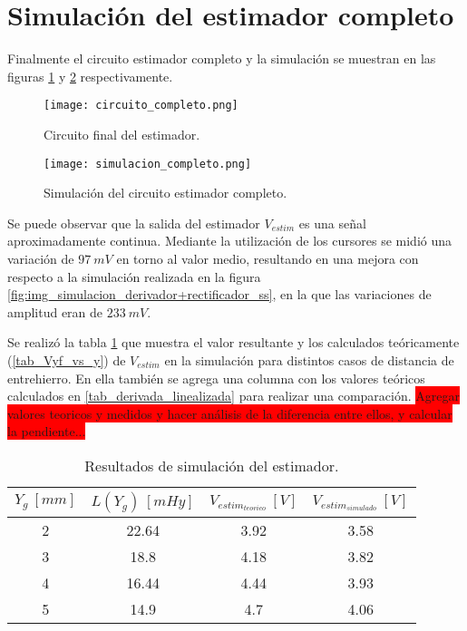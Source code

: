 \section{Simulación del estimador completo}

Finalmente el circuito estimador completo y la simulación se muestran en las figuras \ref{fig:img_circuito_final_del_estimador} y \ref{fig:img_simulacion_completo} respectivamente.

\begin{figure}[H]
\centering
\texttt{[image: circuito\_completo.png]}
\caption{Circuito final del estimador.}
\label{fig:img_circuito_final_del_estimador}
\end{figure}

\begin{figure}[H]
	\centering
	\texttt{[image: simulacion\_completo.png]}
	\caption{Simulación del circuito estimador completo.}
	\label{fig:img_simulacion_completo}
\end{figure}

Se puede observar que la salida del estimador $V_{estim}$ es una señal aproximadamente continua. Mediante la utilización de los cursores se midió una variación de $97\:mV$ en torno al valor medio, resultando en una mejora con respecto a la simulación realizada en la figura \ref{fig:img_simulacion_derivador+rectificador_ss}, en la que las variaciones de amplitud eran de $233\:mV$.

Se realizó la tabla \ref{tab_Resultados_de_simulación_del_estimador} que muestra el valor resultante y los calculados teóricamente (\ref{tab_Vyf_vs_y}) de $V_{estim}$ en la simulación para distintos casos de distancia de entrehierro. En ella también se agrega una columna con los valores teóricos calculados en \ref{tab_derivada_linealizada} para realizar una comparación.
\colorbox{red}{Agregar valores teoricos y medidos y hacer análisis de la diferencia entre ellos, y calcular la pendiente...}

\begin{table}[H]
	\begin{center}
		\begin{tabular}{| c | c | c | c |}
			\hline
			$Y_g\:[mm]$ & $L(Y_g)\:[mHy]$ & $V_{estim_{teorico}}\:[V]$ & $V_{estim_{simulado}}\:[V]$ \\ \hline 
			2 & 22.64 & 3.92 &3.58 \\ \hline 
			3 & 18.8 & 4.18 &3.82 \\ \hline 
			4 & 16.44 & 4.44 &3.93 \\ \hline 
			5 & 14.9 & 4.7 &4.06 \\ \hline 
		\end{tabular}
		\caption{Resultados de simulación del estimador.}
		\label{tab_Resultados_de_simulación_del_estimador}
	\end{center}
\end{table}

